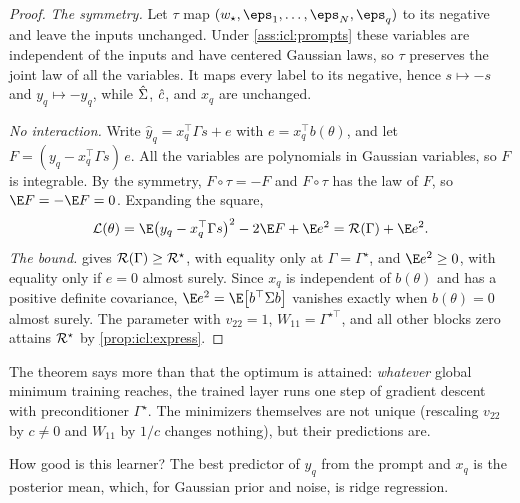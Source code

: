 \begin{refsection}
\begin{proof}
\emph{The symmetry.} Let $\tau$ map $(w_\star,\eps_1,\dots,\eps_N,\eps_q)$ to its negative and leave the inputs unchanged. Under \cref{ass:icl:prompts} these variables are independent of the inputs and have centered Gaussian laws, so $\tau$ preserves the joint law of all the variables. It maps every label to its negative, hence $s\mapsto-s$ and $y_q\mapsto-y_q$, while $\hat\Sigma$, $\hat c$, and $x_q$ are unchanged.

\emph{No interaction.} Write $\hat y_q=x_q^\top\Gamma s+e$ with $e=x_q^\top b(\theta)$, and let $F=(y_q-x_q^\top\Gamma s)\,e$. All the variables are polynomials in Gaussian variables, so $F$ is integrable. By the symmetry, $F\circ\tau=-F$ and $F\circ\tau$ has the law of $F$, so $\E F=-\E F=0$. Expanding the square,
\[
  \Loss(\theta)=\E\bigl(y_q-x_q^\top\Gamma s\bigr)^2-2\E F+\E e^2=\cR(\Gamma)+\E e^2 .
\]
\emph{The bound.}  gives $\mathcal{R}(\Gamma)\ge\mathcal{R}^\star$, with equality only at $\Gamma=\Gamma^\star$, and $\E e^2\ge0$, with equality only if $e=0$ almost surely. Since $x_q$ is independent of $b(\theta)$ and has a positive definite covariance, $\E e^2=\E\bigl[b^\top\Sigma b\bigr]$ vanishes exactly when $b(\theta)=0$ almost surely. The parameter with $v_{22}=1$, $W_{11}=\Gamma^{\star\top}$, and all other blocks zero attains $\mathcal{R}^\star$ by \cref{prop:icl:express}.
\end{proof}

The theorem says more than that the optimum is attained: \emph{whatever} global minimum training reaches, the trained layer runs one step of gradient descent with preconditioner $\Gamma^\star$. The minimizers themselves are not unique (rescaling $v_{22}$ by $c\neq0$ and $W_{11}$ by $1/c$ changes nothing), but their predictions are.

How good is this learner? The best predictor of $y_q$ from the prompt and $x_q$ is the posterior mean, which, for Gaussian prior and noise, is ridge regression.


\end{refsection}

